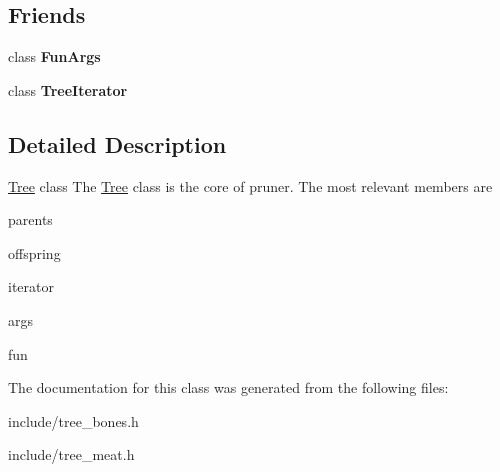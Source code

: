 \subsection*{Friends}
\begin{DoxyCompactItemize}
\item 
class {\bfseries Fun\+Args}\hypertarget{classTree_a667d4fbc407b7cce57e87064b934f905}{}\label{classTree_a667d4fbc407b7cce57e87064b934f905}

\item 
class {\bfseries Tree\+Iterator}\hypertarget{classTree_a925e5a7f5dc110e63f7062d0e6898af9}{}\label{classTree_a925e5a7f5dc110e63f7062d0e6898af9}

\end{DoxyCompactItemize}


\subsection{Detailed Description}
\hyperlink{classTree}{Tree} class The \hyperlink{classTree}{Tree} class is the core of pruner. The most relevant members are
\begin{DoxyItemize}
\item {\ttfamily parents}
\item {\ttfamily offspring}
\item {\ttfamily iterator}
\item {\ttfamily args}
\item {\ttfamily fun} 
\end{DoxyItemize}

The documentation for this class was generated from the following files\+:\begin{DoxyCompactItemize}
\item 
include/tree\+\_\+bones.\+h\item 
include/tree\+\_\+meat.\+h\end{DoxyCompactItemize}
